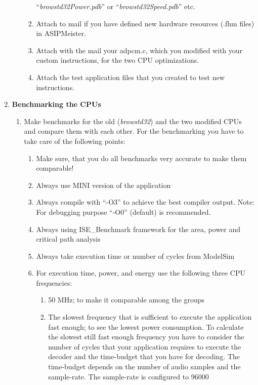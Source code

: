 \begin{enumerate}
\begin{enumerate}
\begin{enumerate}[label=(\alph*),start=1]
			``\emph{browstd32Power.pdb}'' or ``\emph{browstd32Speed.pdb}'' etc.
			\color{red}\item\normalcolor
			Attach to mail if you have defined new hardware resources (.fhm
			files) in ASIPMeister.
			\color{red}\item\normalcolor
			Attach with the mail your adpcm.c, which you modified with your
			custom instructions, for the two CPU optimizations.
			\color{red}\item\normalcolor
			Attach the test application files that you created to test new
			instructions.
		\end{enumerate}
	\end{enumerate}
\item \textbf{Benchmarking the CPUs}
	\begin{enumerate}
		\item
		Make benchmarks for the old (\emph{browstd32}) and the two
			modified CPUs and compare them with each other. For the benchmarking
			you have to take care of the following points:
		\begin{enumerate}
			\item
			Make sure, that you do all benchmarks very accurate to
				make them comparable!
			\item
			Always use MINI version of the application
			\item
			Always compile with ``-O3'' to achieve the best compiler
				output. Note: For debugging purpose ``-O0'' (default) is
				recommended.
			\item
			Always using ISE\_Benchmark framework for the area, power
				and critical path analysis
			\item
			Always take execution time or number of cycles from
				ModelSim
			\item
			For execution time, power, and energy use the following
				three CPU frequencies:
			\begin{enumerate}
				\item
				50 MHz; to make it comparable among the groups
				\item
				The slowest frequency that is sufficient to execute the
					application fast enough; to see the lowest power consumption. To
					calculate the slowest still fast enough frequency you have to
					consider the number of cycles that your application requires to
					execute the decoder and the time-budget that you have for
					decoding. The time-budget depends on the number of audio samples
					and the sample-rate. The sample-rate is configured to 96000

\end{enumerate}
\end{enumerate}
\end{enumerate}
\end{enumerate}
